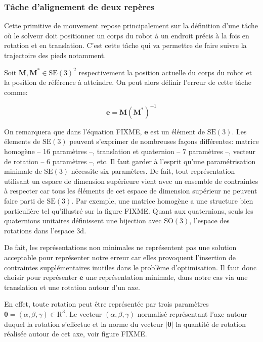 \subsubsection{Tâche d'alignement de deux repères}

Cette primitive de mouvement repose principalement sur la définition
d'une tâche où le solveur doit positionner un corps du robot à un
endroit précis à la fois en rotation et en translation. C'est cette
tâche qui va permettre de faire suivre la trajectoire des pieds
notamment.


Soit $\mathbf{M}, \mathbf{M}^{*} \in \text{SE}(3)^2$
respectivement la position actuelle du corps du robot et la position
de référence à atteindre. On peut alors définir l'erreur de cette
tâche comme:

\begin{equation}
  \mathbf{e} = \mathbf{M} (\mathbf{M}^{*})^{-1}
\end{equation}

On remarquera que dans l'équation FIXME, $\mathbf{e}$ est un élément
de $\text{SE}(3)$. Les élements de $\text{SE}(3)$ peuvent s'exprimer
de nombreuses façons différentes: matrice homogène -- 16 paramètres
--, translation et quaternion -- 7 paramètres --, vecteur de rotation
-- 6 paramètres --, etc. Il faut garder à l'esprit qu'une
paramétrisation minimale de $\text{SE}(3)$ nécessite six
paramètres. De fait, tout représentation utilisant un espace de
dimension supérieure vient avec un ensemble de contraintes à respecter
car tous les éléments de cet espace de dimension supérieur ne peuvent
faire parti de $\text{SE}(3)$. Par exemple, une matrice homogène a une
structure bien particulière tel qu'illustré sur la figure FIXME. Quant
aux quaternions, seuls les quaternions unitaires définissent une
bijection avec $\text{SO}(3)$, l'espace des rotations dans l'espace
3d.

De fait, les représentations non minimales ne représentent pas une
solution acceptable pour représenter notre erreur car elles provoquent
l'insertion de contraintes supplémentaires inutiles dans le problème
d'optimisation. Il faut donc choisir pour représenter $\mathbf{e}$ une
représentation minimale, dans notre cas via une translation et une
rotation autour d'un axe.

En effet, toute rotation peut être représentée par trois paramètres
\mbox{$\mathbf{\theta} = (\alpha, \beta, \gamma) \in \mathrm{R}^3$}. Le
vecteur $(\alpha, \beta, \gamma)$ normalisé représentant l'axe autour
duquel la rotation s'effectue et la norme du vecteur
$|\mathbf{\theta}|$ la quantité de rotation réalisée autour de cet
axe, voir figure FIXME.

